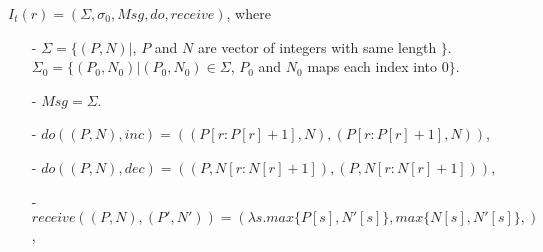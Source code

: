 \begin{example}
\label{definition:state-based PN-counter}
$I_t(r) = (\Sigma, \sigma_0, \mathit{Msg}, \mathit{do},\mathit{receive})$, where

\begin{itemize}
\setlength{\itemsep}{0.5pt}
\item[-] $\Sigma = \{ (P,N) \vert$, $P$ and $N$ are vector of integers with same length $\}$. $\Sigma_0 = \{ (P_0,N_0) \vert (P_0,N_0) \in \Sigma$, $P_0$ and $N_0$ maps each index into $0 \}$.

\item[-] $\mathit{Msg} = \Sigma$.

\item[-] $\mathit{do}((P,N),\mathit{inc}) = ((P[r:P[r]+1],N),(P[r:P[r]+1],N))$,

\item[-] $\mathit{do}((P,N),\mathit{dec}) = ((P,N[r:N[r]+1]),(P,N[r:N[r]+1]))$,

\item[-] $\mathit{receive}((P,N),(P',N')) = (\lambda s. \mathit{max}\{  P[s], N'[s] \}, \mathit{max}\{  N[s], N'[s] \},)$,
\end{itemize}
\end{example}








